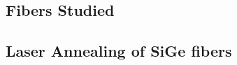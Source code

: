 
\subsection{Fibers Studied}

\FloatBarrier
\subsection{Laser Annealing of SiGe fibers}


\FloatBarrier

\cleardoublepage



